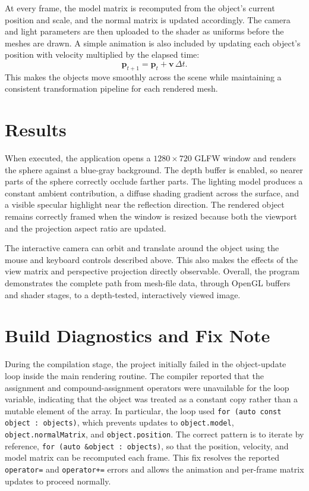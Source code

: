 \documentclass[acmtog]{acmart}
\begin{document}
  At every frame, the model matrix is recomputed from the object's current
  position and scale, and the normal matrix is updated accordingly.  The camera
  and light parameters are then uploaded to the shader as uniforms before the
  meshes are drawn.  A simple animation is also included by updating each
  object's position with velocity multiplied by the elapsed time:
  \[
    \mathbf{p}_{t+1} = \mathbf{p}_t + \mathbf{v}\,\Delta t.
  \]
  This makes the objects move smoothly across the scene while maintaining a
  consistent transformation pipeline for each rendered mesh.

  \section{Results}
  When executed, the application opens a $1280\times720$ GLFW window and
  renders the sphere against a blue-gray background.  The depth buffer is
  enabled, so nearer parts of the sphere correctly occlude farther parts.
  The lighting model produces a constant ambient contribution, a diffuse
  shading gradient across the surface, and a visible specular highlight near
  the reflection direction.  The rendered object remains correctly framed
  when the window is resized because both the viewport and the projection
  aspect ratio are updated.

  The interactive camera can orbit and translate around the object using the
  mouse and keyboard controls described above.  This also makes the effects of
  the view matrix and perspective projection directly observable.  Overall,
  the program demonstrates the complete path from mesh-file data, through
  OpenGL buffers and shader stages, to a depth-tested, interactively viewed
  image.

  \section{Build Diagnostics and Fix Note}
  During the compilation stage, the project initially failed in the object-update
  loop inside the main rendering routine.  The compiler reported that the
  assignment and compound-assignment operators were unavailable for the loop
  variable, indicating that the object was treated as a constant copy rather
  than a mutable element of the array.  In particular, the loop used
  \texttt{for (auto const object : objects)}, which prevents updates to
  \texttt{object.model}, \texttt{object.normalMatrix}, and
  \texttt{object.position}.  The correct pattern is to iterate by reference,
  \texttt{for (auto \&object : objects)}, so that the position, velocity, and
  model matrix can be recomputed each frame.  This fix resolves the reported
  \texttt{operator=} and \texttt{operator+=} errors and allows the animation and
  per-frame matrix updates to proceed normally.
\end{document}
